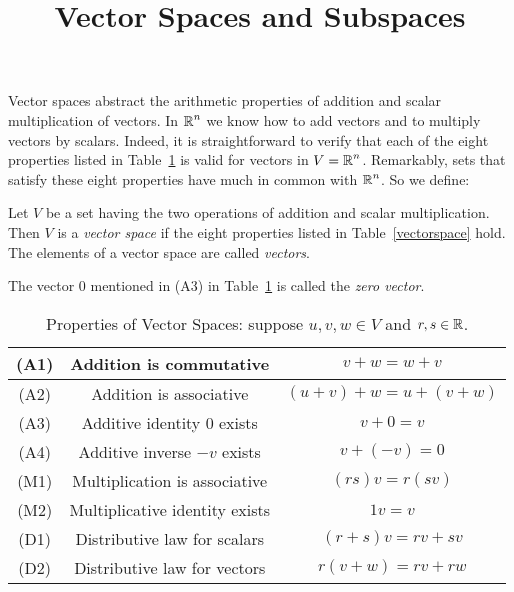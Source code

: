 \documentclass{ximera}
\title{Vector Spaces and Subspaces}
\begin{document}
\begin{abstract}
\end{abstract}
\maketitle

 \label{S:5.1}

Vector spaces abstract the arithmetic properties of addition and
scalar multiplication of vectors.  In $\mbox{$\Bbb{R}$}^n$ we know how to add
vectors and to multiply vectors by scalars.  Indeed, it is
straightforward to verify that each of the eight
properties listed in Table~\ref{vectorspacelist} is valid for
vectors in $V=\mbox{$\Bbb{R}$}^n$.  Remarkably, sets that satisfy these eight
properties have much in common with $\mbox{$\Bbb{R}$}^n$.  So we define:
\begin{definition}  \label{vectorspace}
Let $V$ be a set having the two operations of addition and scalar
multiplication.  Then $V$ is a {\em vector space\/} if the eight
properties listed in Table~\ref{vectorspace} hold.  The elements
of a vector space are called {\em vectors}.
\end{definition} 

The vector $0$ mentioned in (A3) in Table~\ref{vectorspacelist}
is called the {\em zero vector}.

\begin{table*}
\caption{Properties of Vector Spaces: suppose $u,v,w\in V$ and
$r,s\in\mbox{$\Bbb{R}$}$.}
\begin{center}
\begin{tabular}{|c|c|c|}
\hline
(A1) & Addition is commutative & $v+w=w+v$ \\
\hline
(A2) & Addition is associative & $(u+v)+w = u+(v+w)$ \\
\hline
(A3) & Additive identity $0$ exists & $v+0=v$ \\
\hline
(A4) & Additive inverse $-v$ exists & $v+(-v) = 0$ \\
\hline
(M1) & Multiplication is associative & $(rs)v = r(sv)$ \\
\hline
(M2) & Multiplicative identity exists & $1v=v$ \\
\hline
(D1) & Distributive law for scalars & $(r+s)v = rv+sv$ \\
\hline
(D2) & Distributive law for vectors & $r(v+w) = rv+rw$ \\
\hline
\end{tabular}
\end{center}  
 
 
\label{vectorspacelist}
\end{table*}
\end{document}
